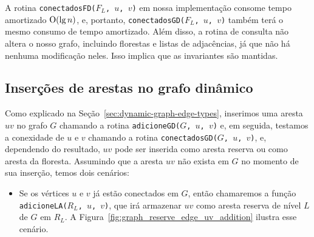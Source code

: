 \raggedbottom


A rotina \texttt{conectadosFD($F_L$, $u$, $v$)} em nossa implementação consome tempo amortizado $\mathrm{O}(\lg n)$, e, portanto, \texttt{conectadosGD($F_L$, $u$, $v$)} também terá o mesmo consumo de tempo amortizado.
Além disso, a rotina de consulta não altera o nosso grafo, incluindo florestas e listas de adjacências, já que não há nenhuma modificação neles. Isso implica que as invariantes são mantidas. 









\subsection{Inserções de arestas no grafo dinâmico}

Como explicado na Seção~\ref{sec:dynamic-graph-edge-types}, inserimos uma aresta $uv$ no grafo $G$ chamando a rotina \texttt{adicioneGD($G$, $u$, $v$)} e, em seguida, testamos a conexidade de $u$ e $v$ chamando a rotina \texttt{conectadosGD($G$, $u$, $v$)}, e, dependendo do resultado, $uv$ pode ser inserida como aresta reserva ou como aresta da floresta. Assumindo que a aresta $uv$ não exista em $G$ no momento de sua inserção, temos dois cenários:

\begin{itemize}
    \item 
    Se os vértices $u$ e $v$ já estão conectados em $G$, então chamaremos a função \texttt{adicioneLA($R_L$, $u$, $v$)}, que irá armazenar $uv$ como aresta reserva de nível $L$ de $G$ em $R_L$. A Figura~\ref{fig:graph_reserve_edge_uv_addition} ilustra esse cenário.

\end{itemize}

